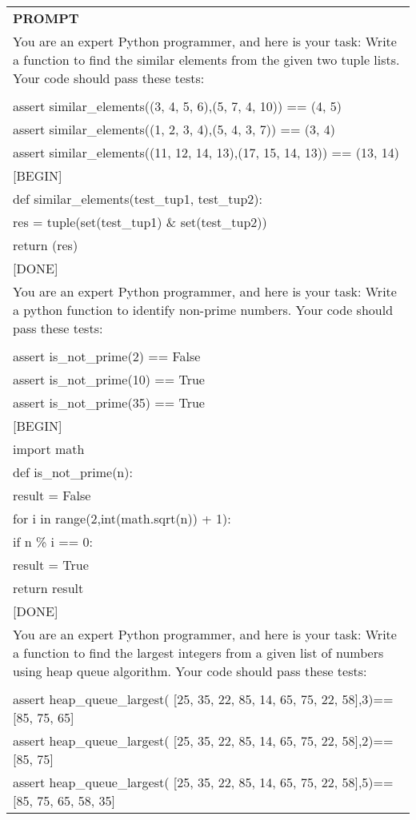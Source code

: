 \begin{table}[ht]
    \centering \small
\begin{tabular}{p{12cm}}
\toprule
\textbf{PROMPT}\\
You are an expert Python programmer, and here is your task: Write a function to find the similar elements from the given two tuple lists. Your code should pass these tests:\\
\\
assert similar\_elements((3, 4, 5, 6),(5, 7, 4, 10)) == (4, 5)\\
assert similar\_elements((1, 2, 3, 4),(5, 4, 3, 7)) == (3, 4)\\
assert similar\_elements((11, 12, 14, 13),(17, 15, 14, 13)) == (13, 14)\\

[BEGIN]\\
def similar\_elements(test\_tup1, test\_tup2):\\
  res = tuple(set(test\_tup1) \& set(test\_tup2))\\
  return (res) \\

[DONE]\\
You are an expert Python programmer, and here is your task: Write a python function to identify non-prime numbers. Your code should pass these tests:\\
\\
assert is\_not\_prime(2) == False\\
assert is\_not\_prime(10) == True\\
assert is\_not\_prime(35) == True\\

[BEGIN]\\
import math\\
def is\_not\_prime(n):\\
    result = False\\
    for i in range(2,int(math.sqrt(n)) + 1):\\
        if n \% i == 0:\\
            result = True\\
    return result\\

[DONE]\\
You are an expert Python programmer, and here is your task: Write a function to find the largest integers from a given list of numbers using heap queue algorithm. Your code should pass these tests:\\
\\
assert heap\_queue\_largest( [25, 35, 22, 85, 14, 65, 75, 22, 58],3)==[85, 75, 65] \\
assert heap\_queue\_largest( [25, 35, 22, 85, 14, 65, 75, 22, 58],2)==[85, 75] \\
assert heap\_queue\_largest( [25, 35, 22, 85, 14, 65, 75, 22, 58],5)==[85, 75, 65, 58, 35]\\


\end{tabular}
\end{table}
